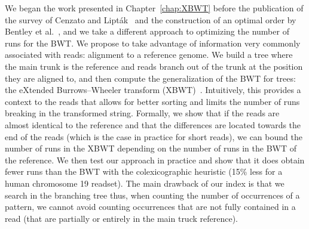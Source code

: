 We began the work presented in Chapter~\ref{chap:XBWT} before the publication of the survey of Cenzato and Lipták~\cite{cenzato_et_al_BWT_Collections} and the construction of an optimal order by Bentley et al.~\cite{bentley2019complexity}, and we take a different approach to optimizing the number of runs for the BWT. We propose to take advantage of information very commonly associated with reads: alignment to a reference genome. We build a tree where the main trunk is the reference and reads branch out of the trunk at the position they are aligned to, and then compute the generalization of the BWT for trees: the eXtended Burrows--Wheeler transform (XBWT)~\cite{ferragina2009compressing}. Intuitively, this provides a context to the reads that allows for better sorting and limits the number of runs breaking in the transformed string. Formally, we show that if the reads are almost identical to the reference and that the differences are located towards the end of the reads (which is the case in practice for short reads), we can bound the number of runs in the XBWT depending on the number of runs in the BWT of the reference. We then test our approach in practice and show that it does obtain fewer runs than the BWT with the colexicographic heuristic (15\% less for a human chromosome 19 readset).
The main drawback of our index is that we search in the branching tree thus, when counting the number of occurrences of a pattern, we cannot avoid counting occurrences that are not fully contained in a read (that are partially or entirely in the main truck reference).

